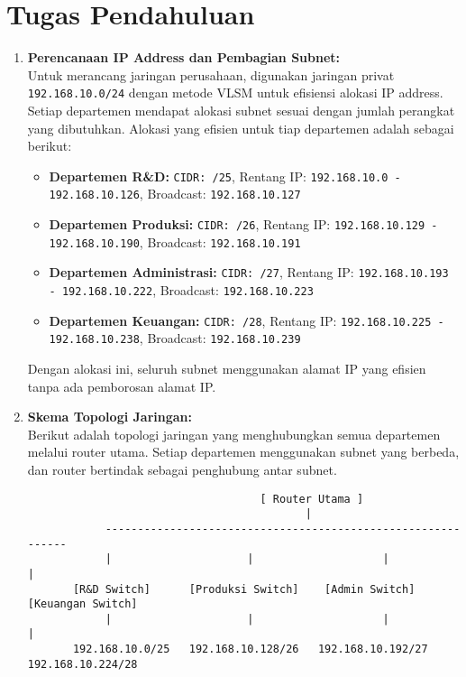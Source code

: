 \section{Tugas Pendahuluan}

\begin{enumerate}
    \item \textbf{Perencanaan IP Address dan Pembagian Subnet:} \\
    Untuk merancang jaringan perusahaan, digunakan jaringan privat \texttt{192.168.10.0/24} dengan metode VLSM untuk efisiensi alokasi IP address. Setiap departemen mendapat alokasi subnet sesuai dengan jumlah perangkat yang dibutuhkan. Alokasi yang efisien untuk tiap departemen adalah sebagai berikut:
    \begin{itemize}
        \item \textbf{Departemen R\&D:}  
        \texttt{CIDR: /25}, Rentang IP: \texttt{192.168.10.0 - 192.168.10.126}, Broadcast: \texttt{192.168.10.127}
        \item \textbf{Departemen Produksi:}  
        \texttt{CIDR: /26}, Rentang IP: \texttt{192.168.10.129 - 192.168.10.190}, Broadcast: \texttt{192.168.10.191}
        \item \textbf{Departemen Administrasi:}  
        \texttt{CIDR: /27}, Rentang IP: \texttt{192.168.10.193 - 192.168.10.222}, Broadcast: \texttt{192.168.10.223}
        \item \textbf{Departemen Keuangan:}  
        \texttt{CIDR: /28}, Rentang IP: \texttt{192.168.10.225 - 192.168.10.238}, Broadcast: \texttt{192.168.10.239}
    \end{itemize}

    Dengan alokasi ini, seluruh subnet menggunakan alamat IP yang efisien tanpa ada pemborosan alamat IP.
    
    \item \textbf{Skema Topologi Jaringan:} \\
    Berikut adalah topologi jaringan yang menghubungkan semua departemen melalui router utama. Setiap departemen menggunakan subnet yang berbeda, dan router bertindak sebagai penghubung antar subnet.
    
    \begin{verbatim}
                                    [ Router Utama ]
                                           |
            -------------------------------------------------------------
            |                     |                    |               |
       [R&D Switch]      [Produksi Switch]    [Admin Switch]   [Keuangan Switch]
            |                     |                    |               |
       192.168.10.0/25   192.168.10.128/26   192.168.10.192/27  192.168.10.224/28
    \end{verbatim}
    

\end{enumerate}
